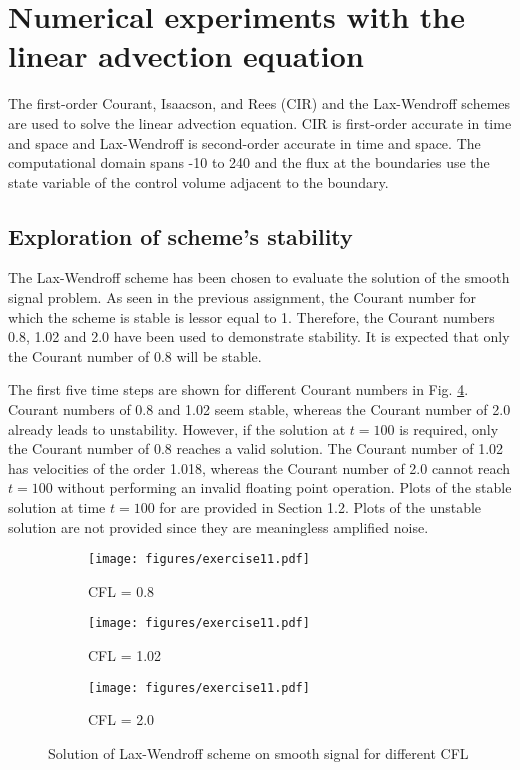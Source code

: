 \documentclass[letterpaper,12pt,]{article}
\begin{document}


\section{Numerical experiments with the linear advection equation}

The first-order Courant, Isaacson, and Rees (CIR) and the Lax-Wendroff schemes are used to solve the linear advection equation.
CIR is first-order accurate in time and space and Lax-Wendroff is second-order accurate in time and space.
The computational domain spans -10 to 240 and the flux at the boundaries use the state variable of the control volume adjacent to the boundary.

\subsection{Exploration of scheme's stability}

The Lax-Wendroff scheme has been chosen to evaluate the solution of the smooth signal problem.
As seen in the previous assignment, the Courant number for which the scheme is stable is lessor equal to 1.
Therefore, the Courant numbers 0.8, 1.02 and 2.0 have been used to demonstrate stability.
It is expected that only the Courant number of 0.8 will be stable.

The first five time steps are shown for different Courant numbers in Fig. \ref{fig:e11}.
Courant numbers of 0.8 and 1.02 seem stable, whereas the Courant number of 2.0 already leads to unstability.
However, if the solution at $t=100$ is required, only the Courant number of 0.8 reaches a valid solution.
The Courant number of 1.02 has velocities of the order 1.018, whereas the Courant number of 2.0 cannot reach $t=100$ without performing an invalid floating point operation.
Plots of the stable solution at time $t=100$ for are provided in Section 1.2.
Plots of the unstable solution are not provided since they are meaningless amplified noise.
\begin{figure}[htb]%
  \centering%
  \begin{subfigure}[b]{\textwidth}
    \texttt{[image: figures/exercise11.pdf]}
    \caption{CFL = 0.8}
    \label{fig:e11cfl80}
  \end{subfigure}
  \begin{subfigure}[b]{\textwidth}
    \texttt{[image: figures/exercise11.pdf]}
    \caption{CFL = 1.02}
    \label{fig:e11cfl102}
  \end{subfigure}
  \begin{subfigure}[b]{\textwidth}
    \texttt{[image: figures/exercise11.pdf]}
    \caption{CFL = 2.0}
    \label{fig:e11cfl2}
  \end{subfigure}
\caption{Solution of Lax-Wendroff scheme on smooth signal for different CFL}
\label{fig:e11}
\end{figure}
\end{document}
